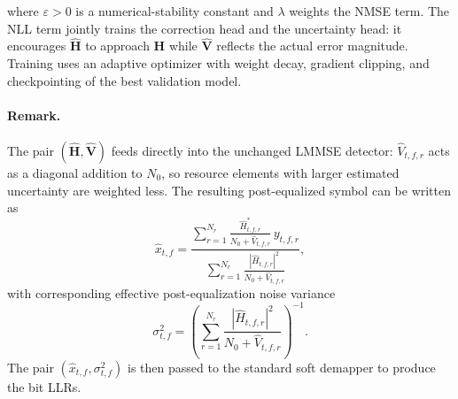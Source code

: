 \documentclass[conference,letterpaper]{IEEEtran}
\begin{document}
	where $\varepsilon>0$ is a numerical-stability constant and $\lambda$ weights the NMSE term.
	The NLL term jointly trains the correction head and the uncertainty head: it encourages $\widehat{\mathbf{H}}$ to approach $\mathbf{H}$ while $\widehat{\mathbf{V}}$ reflects the actual error magnitude.
	Training uses an adaptive optimizer with weight decay, gradient clipping, and checkpointing of the best validation model.
	
	
	\paragraph*{Remark.}
	The pair $(\widehat{\mathbf{H}},\widehat{\mathbf{V}})$ feeds directly into the unchanged LMMSE detector: $\widehat{V}_{t,f,r}$ acts as a diagonal addition to $N_0$, so resource elements with larger estimated uncertainty are weighted less. The resulting post-equalized symbol can be written as
	\begin{equation}
		\label{eq:lmmse_consumption_symbol}
		\widehat{x}_{t,f}
		=
		\frac{\displaystyle\sum_{r=1}^{N_r}
			\frac{\widehat{H}^{*}_{t,f,r}}{N_0+\widehat{V}_{t,f,r}}\,y_{t,f,r}}
		{\displaystyle\sum_{r=1}^{N_r}
			\frac{\left|\widehat{H}_{t,f,r}\right|^2}{N_0+\widehat{V}_{t,f,r}}},
	\end{equation}
	with corresponding effective post-equalization noise variance
	\begin{equation}
		\label{eq:lmmse_consumption_var}
		\sigma^2_{t,f}
		=
		\left(
		\sum_{r=1}^{N_r}
		\frac{\left|\widehat{H}_{t,f,r}\right|^2}{N_0+\widehat{V}_{t,f,r}}
		\right)^{-1}.
	\end{equation}
	The pair $(\widehat{x}_{t,f},\sigma^2_{t,f})$ is then passed to the standard soft demapper to produce the bit LLRs. 
	
\end{document}

